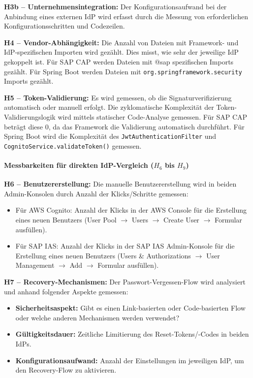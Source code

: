 \textbf{H3b – Unternehmensintegration:} Der
Konfigurationsaufwand bei der Anbindung eines externen \ac{IdP} wird erfasst
durch die Messung von erforderlichen Konfigurationsschritten und Codezeilen.

\textbf{H4 – Vendor-Abhängigkeit:} Die Anzahl von Dateien mit Framework- und
\ac{IdP}-spezifischen Importen wird gezählt. Dies misst, wie sehr der jeweilige \ac{IdP} gekoppelt ist. Für \ac{SAP CAP} werden Dateien mit @sap
spezifischen Imports gezählt. Für Spring Boot werden Dateien mit \texttt{org.springframework.security} Imports gezählt.

\textbf{H5 – Token-Validierung:} Es wird gemessen, ob die Signaturverifizierung
automatisch oder manuell erfolgt. Die zyklomatische Komplexität der Token-Validierungslogik wird mittels statischer Code-Analyse gemessen. Für \ac{SAP CAP} beträgt diese 0, da das Framework die Validierung automatisch durchführt.
Für Spring Boot wird die Komplexität des \texttt{JwtAuthenticationFilter} und \texttt{CognitoService.validateToken()} gemessen.

\paragraph{Messbarkeiten für direkten IdP-Vergleich ($H_6$ bis $H_9$)}

\textbf{H6 – Benutzererstellung:} Die manuelle Benutzererstellung wird in beiden Admin-Konsolen durch Anzahl der Klicks/Schritte gemessen:
\begin{itemize}
    \item Für \ac{AWS} Cognito: Anzahl der Klicks in der AWS Console für die Erstellung eines neuen Benutzers (User Pool $\rightarrow$ Users $\rightarrow$ Create User $\rightarrow$ Formular ausfüllen).
    \item Für \ac{SAP IAS}: Anzahl der Klicks in der SAP IAS Admin-Konsole für die Erstellung eines neuen Benutzers (Users \& Authorizations $\rightarrow$ User Management $\rightarrow$ Add $\rightarrow$ Formular ausfüllen).
\end{itemize}

\textbf{H7 – Recovery-Mechanismen:}
Der Passwort-Vergessen-Flow wird analysiert und anhand folgender Aspekte gemessen:
\begin{itemize}
    \item \textbf{Sicherheitsaspekt:} Gibt es einen Link-basierten oder Code-basierten Flow oder welche anderen Mechanismen werden verwendet?
    \item \textbf{Gültigkeitsdauer:} Zeitliche Limitierung des Reset-Tokens/-Codes in beiden \ac{IdP}s.
    \item \textbf{Konfigurationsaufwand:} Anzahl der Einstellungen im jeweiligen \ac{IdP}, um den Recovery-Flow zu aktivieren.
\end{itemize}

